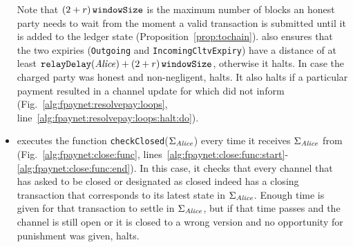 \begin{itemize}
\begin{enumerate}
       - \tochain]$ with a distance of at least
      \tochain{} between the two \textsc{poll}s or
      \item did not enforce the retrieval of her funds when the chain in view
      had height $ - \tochain$
      (Fig.~\ref{alg:fpaynet:resolvepay},
      line~\ref{alg:fpaynet:resolvepay:haltcond:abs}) with a
      \textsc{fulfillOnChain} message, as discussed below.
    \end{enumerate}
    Note that $\tochain$ is the maximum number of blocks an honest party needs
    to wait from the moment a valid transaction is submitted until it is added
    to the ledger state (Proposition~\ref{prop:tochain}). \fpaynet{} also
    ensures that the two expiries (\texttt{Outgoing} and
    \texttt{IncomingCltvExpiry}) have a distance of at least
    $(\alice) + \tochain$, otherwise it halts. In case the
    charged party was honest and non-negligent, \fpaynet{} halts. It also halts
    if a particular payment resulted in a channel update for which \simulator{}
    did not inform \fpaynet{} (Fig.~\ref{alg:fpaynet:resolvepay:loops},
    line~\ref{alg:fpaynet:resolvepay:loops:halt:do}).
    \item \fpaynet{} executes the function
    \texttt{checkClosed}($\Sigma_{\alice}$) every time it receives
    $\Sigma_{\alice}$ from \ledger{} (Fig.~\ref{alg:fpaynet:close:func},
    lines~\ref{alg:fpaynet:close:func:start}-\ref{alg:fpaynet:close:func:end}).
    In this case, it checks that every channel that \environment{} has asked to
    be closed or \simulator{} designated as closed indeed has a closing
    transaction that corresponds to its latest state in $\Sigma_{\alice}$.
    Enough time is given for that transaction to settle in $\Sigma_{\alice}$,
    but if that time passes and the channel is still open or it is closed to a
    wrong version and no opportunity for punishment was given, \fpaynet{} halts.
  \end{itemize}

